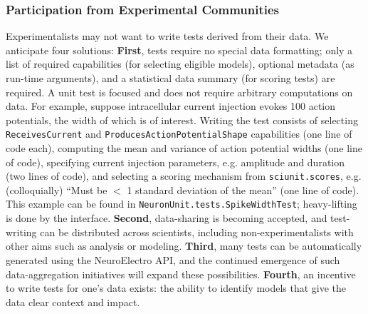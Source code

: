 \documentclass[11pt,letterpaper]{article}
\let\verbx\lstinline
\begin{document}
\subsubsection{Participation from Experimental Communities}
Experimentalists may not want to write tests derived from their data.  We anticipate four solutions: \textbf{First}, tests require no special data formatting; only a list of required  capabilities (for selecting eligible models), optional metadata (as run-time arguments), and a statistical data summary (for scoring tests) are required.  A unit test is focused and does not require arbitrary computations on data.  For example, suppose intracellular current injection evokes 100 action potentials, the width of which is of interest.  Writing the test consists of selecting \verbx{ReceivesCurrent} and \verbx{ProducesActionPotentialShape} capabilities (one line of code each), computing the mean and variance of action potential widths (one line of code), specifying current injection parameters, e.g. amplitude and duration (two lines of code), and selecting a scoring mechanism from \verbx{sciunit.scores}, e.g. (colloquially) ``Must be $<$ 1 standard deviation of the mean'' (one line of code).  This example can be found in \verbx{NeuronUnit.tests.SpikeWidthTest}; heavy-lifting is done by the interface.
\textbf{Second}, data-sharing is becoming accepted, and test-writing can be distributed across scientists, including non-experimentalists with other aims such as analysis or modeling. 
\textbf{Third}, many tests can be automatically generated using the NeuroElectro API, and the continued emergence of such data-aggregation initiatives will expand these possibilities. 
\textbf{Fourth}, an incentive to write tests for one's data exists: the ability to identify models that give the data clear context and impact. 
\end{document}
